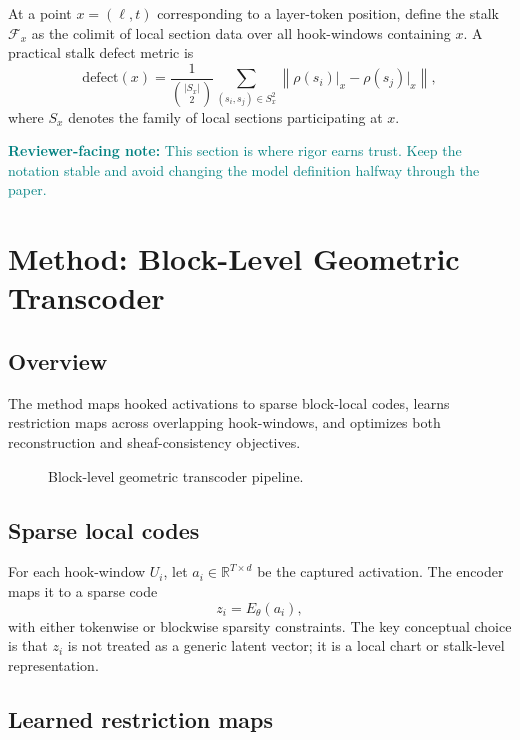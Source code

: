 \documentclass[11pt]{article}
\newcommand{\reviewer}[1]{\textcolor{teal}{\textbf{Reviewer-facing note:} #1}}
\newcommand{\R}{\mathbb{R}}
\begin{document}
At a point $x = (\ell,t)$ corresponding to a layer-token position, define the stalk $\mathcal{F}_x$ as the colimit of local section data over all hook-windows containing $x$. A practical stalk defect metric is
\[
\mathrm{defect}(x)
=
\frac{1}{\binom{|S_x|}{2}}
\sum_{(s_i,s_j)\in S_x^2}
\left\|
\rho(s_i)\vert_x - \rho(s_j)\vert_x
\right\|,
\]
where $S_x$ denotes the family of local sections participating at $x$.

\reviewer{This section is where rigor earns trust. Keep the notation stable and avoid changing the model definition halfway through the paper.}

\section{Method: Block-Level Geometric Transcoder}

\subsection{Overview}

The method maps hooked activations to sparse block-local codes, learns restriction maps across overlapping hook-windows, and optimizes both reconstruction and sheaf-consistency objectives.

\begin{figure}[H]
\centering
{}
\caption{Block-level geometric transcoder pipeline.}
\end{figure}

\subsection{Sparse local codes}

For each hook-window $U_i$, let $a_i \in \R^{T\times d}$ be the captured activation. The encoder maps it to a sparse code
\[
z_i = E_\theta(a_i),
\]
with either tokenwise or blockwise sparsity constraints. The key conceptual choice is that $z_i$ is not treated as a generic latent vector; it is a local chart or stalk-level representation.

\subsection{Learned restriction maps}
\end{document}
